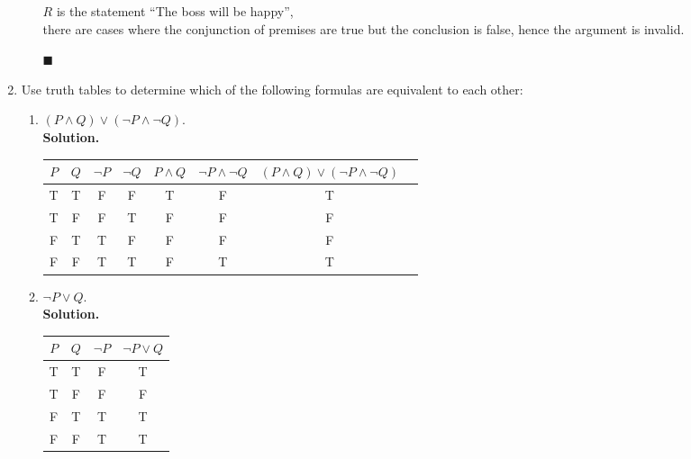 \documentclass{report}
\newcommand{\sol}{\vspace{1em}\\\textbf{Solution.}\vspace{0.5em}}
\newcommand{\qed}{\ \\\strut\hfill$\blacksquare$\vspace{1em}}
\begin{document}
\begin{enumerate}[leftmargin=*]
\begin{enumerate}
                    $R$ is the statement ``The boss will be happy'',\\

                    there are cases where the conjunction of premises are true but the conclusion
                    is false, hence the argument is invalid.\qed
          \end{enumerate}

          \newpage
    \item Use truth tables to determine which of the following formulas are equivalent to
          each other:
          \begin{enumerate}
              \item $(P \wedge Q) \vee(\neg P \wedge \neg Q)$.
                    \sol{}
                    \begin{center}
                        \begin{tabular}{cccccccc}
                            $P$ & $Q$ & $\neg P$ & $\neg Q$ & $P \wedge Q$ & $\neg P \wedge \neg Q$ & $(P \wedge Q) \vee(\neg P \wedge \neg Q)$ \\
                            \hline
                            T   & T   & F        & F        & T            & F                      & T                                         \\
                            T   & F   & F        & T        & F            & F                      & F                                         \\
                            F   & T   & T        & F        & F            & F                      & F                                         \\
                            F   & F   & T        & T        & F            & T                      & T
                        \end{tabular}
                    \end{center}

              \item $\neg P \vee Q$.
                    \sol{}
                    \begin{center}
                        \begin{tabular}{cccc}
                            $P$ & $Q$ & $\neg P$ & $\neg P \vee Q$ \\
                            \hline
                            T   & T   & F        & T               \\
                            T   & F   & F        & F               \\
                            F   & T   & T        & T               \\
                            F   & F   & T        & T
                        \end{tabular}
                    \end{center}


\end{enumerate}
\end{enumerate}
\end{document}
